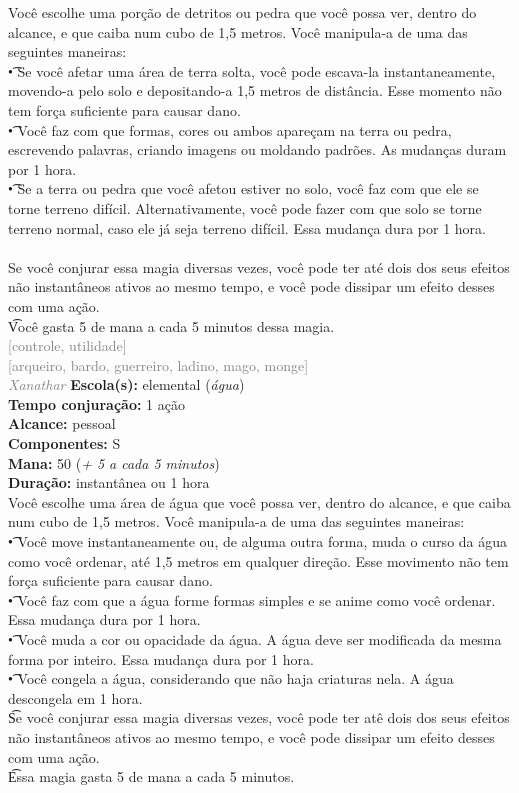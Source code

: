 \documentclass{RPG_Adventure}[2021/10/20]
\begin{document}
{\normalsize Você escolhe uma porção de detritos ou pedra que você possa ver, dentro do alcance, e que caiba num cubo de 1,5 metros. Você manipula-a de uma das seguintes maneiras: \\\t • Se você afetar uma área de terra solta, você pode escava-la instantaneamente, movendo-a pelo solo e depositando-a 1,5 metros de distância. Esse momento não tem força suficiente para causar dano.\\\t • Você faz com que formas, cores ou ambos apareçam na terra ou pedra, escrevendo palavras, criando imagens ou moldando padrões. As mudanças duram por 1 hora.\\\t • Se a terra ou pedra que você afetou estiver no solo, você faz com que ele se torne terreno difícil. Alternativamente, você pode fazer com que solo se torne terreno normal, caso ele já seja terreno difícil. Essa mudança dura por 1 hora.\\\\Se você conjurar essa magia diversas vezes, você pode ter até dois dos seus efeitos não instantâneos ativos ao mesmo tempo, e você pode dissipar um efeito desses com uma ação.\\\t Você gasta 5 de mana a cada 5 minutos dessa magia.\\}
{\scriptsize \textcolor{gray}{[controle, utilidade]\\}}
{\scriptsize \textcolor{gray}{[arqueiro, bardo, guerreiro, ladino, mago, monge]\\}}
{\tiny \textcolor{gray}{\textit{Xanathar}}}\jump{}
{\small \t \textbf{Escola(s):} elemental (\textit{água})\\\t \textbf{Tempo conjuração:} 1 ação\\\t \textbf{Alcance:} pessoal\\\t \textbf{Componentes:} S\\\t \textbf{Mana:} 50 (\textit{+ 5 a cada 5 minutos})\\\t \textbf{Duração:} instantânea ou 1 hora\\}
{\normalsize Você escolhe uma área de água que você possa ver, dentro do alcance, e que caiba num cubo de 1,5 metros. Você manipula-a de uma das seguintes maneiras:\\\t • Você move instantaneamente ou, de alguma outra forma, muda o curso da água como você ordenar, até 1,5 metros em qualquer direção. Esse movimento não tem força suficiente para causar dano.\\\t • Você faz com que a água forme formas simples e se anime como você ordenar. Essa mudança dura por 1 hora.\\\t • Você muda a cor ou opacidade da água. A água deve ser modificada da mesma forma por inteiro. Essa mudança dura por 1 hora.\\\t • Você congela a água, considerando que não haja criaturas nela. A água descongela em 1 hora.\\\t Se você conjurar essa magia diversas vezes, você pode ter atê dois dos seus efeitos não instantâneos ativos ao mesmo tempo, e você pode dissipar um efeito desses com uma ação.\\\t Essa magia gasta 5 de mana a cada 5 minutos.\\}
\end{document}
